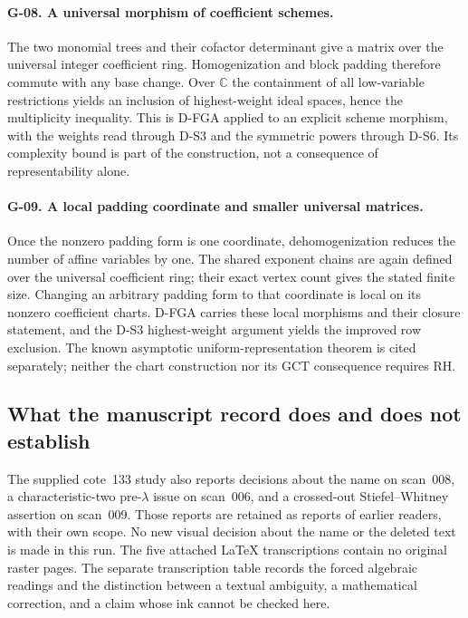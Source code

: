 \documentclass[11pt,a4paper]{article}
\theoremstyle{definition}\newtheorem{definition}{Definition}
\begin{document}
\paragraph{G-08. A universal morphism of coefficient schemes.}
The two monomial trees and their cofactor determinant give a matrix over the universal integer coefficient ring. Homogenization and block padding therefore commute with any base change. Over $\mathbb C$ the containment of all low-variable restrictions yields an inclusion of highest-weight ideal spaces, hence the multiplicity inequality. This is D-FGA applied to an explicit scheme morphism, with the weights read through D-S3 and the symmetric powers through D-S6. Its complexity bound is part of the construction, not a consequence of representability alone.

\paragraph{G-09. A local padding coordinate and smaller universal matrices.}
Once the nonzero padding form is one coordinate, dehomogenization reduces the number of affine variables by one. The shared exponent chains are again defined over the universal coefficient ring; their exact vertex count gives the stated finite size. Changing an arbitrary padding form to that coordinate is local on its nonzero coefficient charts. D-FGA carries these local morphisms and their closure statement, and the D-S3 highest-weight argument yields the improved row exclusion. The known asymptotic uniform-representation theorem is cited separately; neither the chart construction nor its GCT consequence requires RH.

\subsection{What the manuscript record does and does not establish}
The supplied cote~133 study also reports decisions about the name on scan~008, a characteristic-two pre-$\lambda$ issue on scan~006, and a crossed-out Stiefel--Whitney assertion on scan~009. Those reports are retained as reports of earlier readers, with their own scope. No new visual decision about the name or the deleted text is made in this run. The five attached LaTeX transcriptions contain no original raster pages. The separate transcription table records the forced algebraic readings and the distinction between a textual ambiguity, a mathematical correction, and a claim whose ink cannot be checked here.
\end{document}
